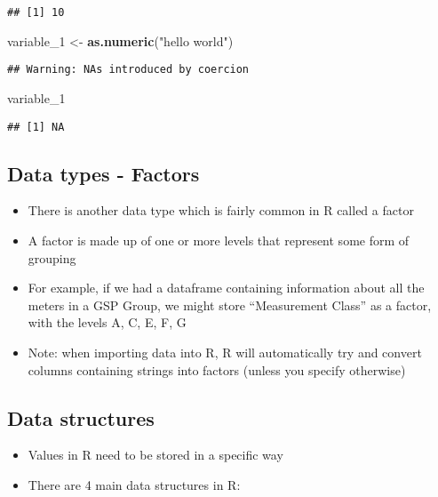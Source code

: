 \documentclass[]{article}
\newenvironment{Shaded}{\begin{snugshade}}{\end{snugshade}}
\newcommand{\KeywordTok}[1]{\textcolor[rgb]{0.13,0.29,0.53}{\textbf{#1}}}
\newcommand{\DecValTok}[1]{\textcolor[rgb]{0.00,0.00,0.81}{#1}}
\newcommand{\StringTok}[1]{\textcolor[rgb]{0.31,0.60,0.02}{#1}}
\newcommand{\NormalTok}[1]{#1}
\providecommand{\tightlist}{%
  \setlength{\itemsep}{0pt}\setlength{\parskip}{0pt}}
\begin{document}
\begin{verbatim}
## [1] 10
\end{verbatim}

\begin{Shaded}
\begin{Highlighting}[]
\NormalTok{variable_}\DecValTok{1}\NormalTok{ <-}\StringTok{ }\KeywordTok{as.numeric}\NormalTok{(}\StringTok{"hello world"}\NormalTok{)}
\end{Highlighting}
\end{Shaded}

\begin{verbatim}
## Warning: NAs introduced by coercion
\end{verbatim}

\begin{Shaded}
\begin{Highlighting}[]
\NormalTok{variable_}\DecValTok{1}
\end{Highlighting}
\end{Shaded}

\begin{verbatim}
## [1] NA
\end{verbatim}

\subsection{Data types - Factors}\label{data-types---factors}

\begin{itemize}
\tightlist
\item
  There is another data type which is fairly common in R called a factor
\item
  A factor is made up of one or more levels that represent some form of
  grouping
\item
  For example, if we had a dataframe containing information about all
  the meters in a GSP Group, we might store ``Measurement Class'' as a
  factor, with the levels A, C, E, F, G
\item
  Note: when importing data into R, R will automatically try and convert
  columns containing strings into factors (unless you specify otherwise)
\end{itemize}

\subsection{Data structures}\label{data-structures}

\begin{itemize}
\tightlist
\item
  Values in R need to be stored in a specific way
\item
  There are 4 main data structures in R:
\end{itemize}
\end{document}
